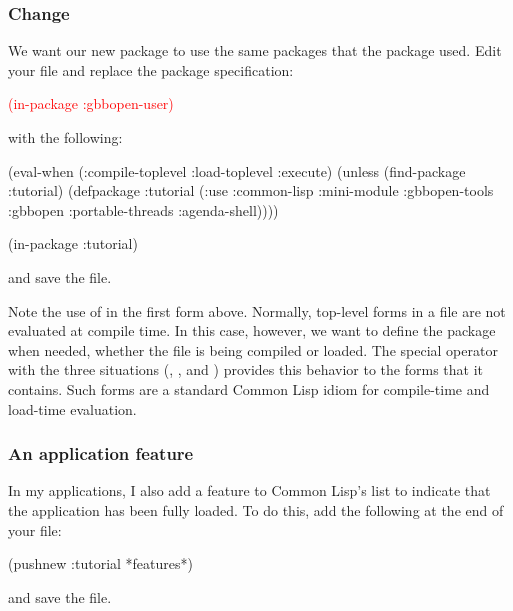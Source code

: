 \documentclass[10pt,twoside,english,pdftex]{article}
\begin{document}
\subsubsection*{Change }
%
We want our new  package to use the same packages that the
 package used. Edit your 
file and replace the  package specification:
%
\W\supp
\begin{example}
  \textcolor{red}{(in-package :gbbopen-user)}
\end{example}
%
with the following:
%
\W\supp\notpretop
\begin{example}
  (eval-when (:compile-toplevel :load-toplevel :execute)
    (unless (find-package :tutorial)
      (defpackage :tutorial
        (:use :common-lisp :mini-module :gbbopen-tools :gbbopen 
              :portable-threads :agenda-shell))))

  (in-package :tutorial)
\end{example}
%
and save the file.

Note the use of  in the first form above.  Normally, top-level
forms in a file are not evaluated at compile time.  In this case, however, we
want to define the  package when needed, whether the file is
being compiled or loaded.  The  special operator with the
three situations (, , and ) provides this behavior to the forms that it contains.  Such
 forms are a standard Common Lisp idiom for compile-time and
load-time evaluation.

\subsubsection*{An application feature}
%
In my applications, I also add a feature to Common Lisp's 
list to indicate that the application has been fully loaded.  To do this, add
the following at the end of your  file:
%
\W\supp
\begin{example}
  (pushnew :tutorial *features*)
\end{example}
%
and save the file.
\end{document}
